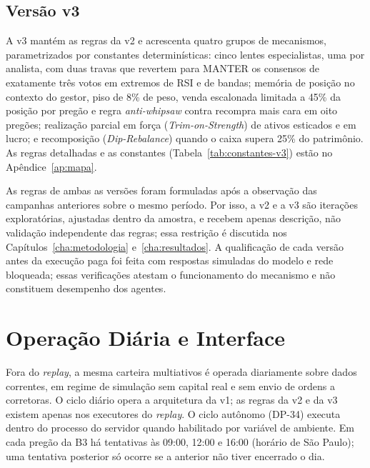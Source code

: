\subsection{Versão v3}

A v3 mantém as regras da v2 e acrescenta quatro grupos de mecanismos, parametrizados por constantes determinísticas: cinco lentes especialistas, uma por analista, com duas travas que revertem para MANTER os consensos de exatamente três votos em extremos de RSI e de bandas; memória de posição no contexto do gestor, piso de 8\% de peso, venda escalonada limitada a 45\% da posição por pregão e regra \textit{anti-whipsaw} contra recompra mais cara em oito pregões; realização parcial em força (\textit{Trim-on-Strength}) de ativos esticados e em lucro; e recomposição (\textit{Dip-Rebalance}) quando o caixa supera 25\% do patrimônio. As regras detalhadas e as constantes (Tabela~\ref{tab:constantes-v3}) estão no Apêndice~\ref{ap:mapa}.

As regras de ambas as versões foram formuladas após a observação das campanhas anteriores sobre o mesmo período. Por isso, a v2 e a v3 são iterações exploratórias, ajustadas dentro da amostra, e recebem apenas descrição, não validação independente das regras; essa restrição é discutida nos Capítulos~\ref{cha:metodologia} e~\ref{cha:resultados}. A qualificação de cada versão antes da execução paga foi feita com respostas simuladas do modelo e rede bloqueada; essas verificações atestam o funcionamento do mecanismo e não constituem desempenho dos agentes.

\section{Operação Diária e Interface}
\label{sec:arq-operacao-diaria}

Fora do \textit{replay}, a mesma carteira multiativos é operada diariamente sobre dados correntes, em regime de simulação sem capital real e sem envio de ordens a corretoras. O ciclo diário opera a arquitetura da v1; as regras da v2 e da v3 existem apenas nos executores do \textit{replay}. O ciclo autônomo (\mbox{DP-34}) executa dentro do processo do servidor quando habilitado por variável de ambiente. Em cada pregão da B3 há tentativas às 09:00, 12:00 e 16:00 (horário de São Paulo); uma tentativa posterior só ocorre se a anterior não tiver encerrado o dia.

